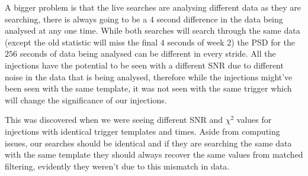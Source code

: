 A bigger problem is that the live searches are analysing different data as they are searching, there is always going to be a $4$ second difference in the data being analysed at any one time. While both searches will search through the same data (except the old statistic will miss the final $4$ seconds of week 2) the PSD for the $256$ seconds of data being analysed can be different in every stride. All the injections have the potential to be seen with a different SNR due to different noise in the data that is being analysed, therefore while the injections might've been seen with the same template, it was not seen with the same trigger which will change the significance of our injections.

This was discovered when we were seeing different SNR and $\chi^{2}$ values for injections with identical trigger templates and times. Aside from computing issues, our searches should be identical and if they are searching the same data with the same template they should always recover the same values from matched filtering, evidently they weren't due to this mismatch in data.

